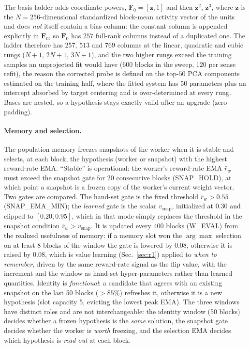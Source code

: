\documentclass[preprint,12pt]{elsarticle}
\begin{document}
The basis ladder adds
coordinate powers, $\mathbf F_0=[\mathbf z,1]$ and then $\mathbf z^2$,
$\mathbf z^3$, where $\mathbf z$ is the $N=256$-dimensional standardized
block-mean activity vector of the units and does \emph{not} itself contain a
bias column: the constant column is appended explicitly in $\mathbf F_0$,
so $\mathbf F_0$ has $257$ full-rank columns instead of a duplicated one.
The ladder therefore has $257$, $513$ and $769$ columns at the linear,
quadratic and cubic rungs ($N+1$, $2N+1$, $3N+1$), and the two higher rungs
exceed the training samples an unprojected fit would have ($600$ blocks in
the sweep, $120$ per sense refit), the reason the corrected probe is
defined on the top-$50$ PCA components estimated on the training half, where
the fitted system has $50$ parameters plus an intercept absorbed by target
centering and is over-determined at every rung. Bases are nested, so a
hypothesis stays exactly valid after an upgrade (zero-padding).

\paragraph{Memory and selection.} The population memory freezes snapshots of
the worker when it is stable and selects, at each block, the hypothesis
(worker or snapshot) with the highest reward-rate EMA. ``Stable'' is
operational: the worker's reward-rate EMA $\bar r_w$ must exceed the snapshot
gate for $20$ consecutive blocks (SNAP\_HOLD), at which point a snapshot is a
frozen copy of the worker's current weight vector. Two gates are compared.
The hand-set gate is the fixed threshold $\bar r_w>0.55$ (SNAP\_EMA\_MIN);
the \emph{learned} gate is the scalar $v_{\mathrm{snap}}$, initialized at
$0.30$ and clipped to $[0.20,0.95]$, which in that mode simply replaces the
threshold in the snapshot condition $\bar r_w>v_{\mathrm{snap}}$. It is
updated every $400$ blocks (W\_EVAL) from the realized usefulness of memory:
if a memory slot won the $\arg\max$ selection on at least $8$ blocks of the
window the gate is lowered by $0.08$, otherwise it is raised by $0.08$, which is
value learning (Sec.~\ref{sec:r1}) applied to \emph{when to remember},
driven by the same reward-rate signal as the flip value, with the increment
and the window as hand-set hyper-parameters rather than learned quantities.
Identity is
\emph{functional}: a candidate that agrees with an existing snapshot on the
last 50 blocks ($>85\%$) refreshes it, otherwise it is a new hypothesis
(slot capacity 5, evicting the lowest peak EMA). The three windows have
distinct roles and are not interchangeable: the identity window (50 blocks)
decides whether a frozen hypothesis is the \emph{same} solution, the snapshot
gate decides whether the worker is \emph{worth} freezing, and the selection
EMA decides which hypothesis is \emph{read out} at each block.
\end{document}
